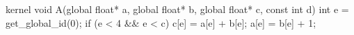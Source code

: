 kernel void A(global float* a,
              global float* b,
              global float* c,
              const int d) {
  int e = get_global_id(0);
  if (e < 4 && e < c) {
    c[e] = a[e] + b[e];
    a[e] = b[e] + 1;
  }
}
